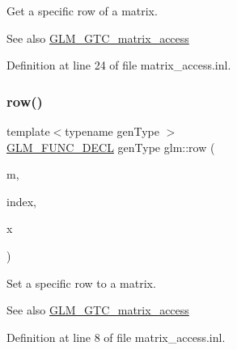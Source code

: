 Get a specific row of a matrix. \begin{DoxySeeAlso}{See also}
\mbox{\hyperlink{group__gtc__matrix__access}{G\+L\+M\+\_\+\+G\+T\+C\+\_\+matrix\+\_\+access}} 
\end{DoxySeeAlso}


Definition at line 24 of file matrix\+\_\+access.\+inl.

\mbox{\label{group__gtc__matrix__access_gaadcc64829aadf4103477679e48c7594f}} 
\subsubsection{\texorpdfstring{row()}{row()}\hspace{0.1cm}{\footnotesize\ttfamily [2/2]}}
{\footnotesize\ttfamily template$<$typename gen\+Type $>$ \\
\mbox{\hyperlink{setup_8hpp_ab2d052de21a70539923e9bcbf6e83a51}{G\+L\+M\+\_\+\+F\+U\+N\+C\+\_\+\+D\+E\+CL}} gen\+Type glm\+::row (\begin{DoxyParamCaption}\item[{gen\+Type const \&}]{m,  }\item[{\mbox{\hyperlink{namespaceglm_a090a0de2260835bee80e71a702492ed9}{length\+\_\+t}}}]{index,  }\item[{typename gen\+Type\+::row\+\_\+type const \&}]{x }\end{DoxyParamCaption})}

Set a specific row to a matrix. \begin{DoxySeeAlso}{See also}
\mbox{\hyperlink{group__gtc__matrix__access}{G\+L\+M\+\_\+\+G\+T\+C\+\_\+matrix\+\_\+access}} 
\end{DoxySeeAlso}


Definition at line 8 of file matrix\+\_\+access.\+inl.

